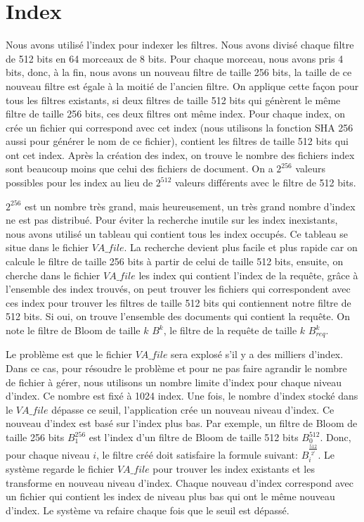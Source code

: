\section{Index}
	Nous avons utilisé l'index pour indexer les filtres. Nous avons divisé chaque filtre de 512 bits en 64 morceaux de 8 bits. Pour chaque morceau, nous avons pris 4 bits, donc, à la fin, nous avons un nouveau filtre de taille 256 bits, la taille de ce nouveau filtre est égale à la moitié de l'ancien filtre. On applique cette façon pour tous les filtres existants, si deux filtres de taille 512 bits qui génèrent le même filtre de taille 256 bits, ces deux filtres ont même index. Pour chaque index, on crée un fichier qui correspond avec cet index (\-nous utilisons la fonction SHA 256 aussi pour générer le nom de ce fichier), contient les filtres de taille 512 bits qui ont cet index. Après la création des index, on trouve le nombre des fichiers index sont beaucoup moins que celui des fichiers de document. On a $2^{256}$ valeurs possibles pour les index au lieu de $2^{512}$ valeurs différents avec le filtre de 512 bits.
	
	$2^{256}$ est un nombre très grand, mais heureusement, un très grand nombre d'index ne est pas distribué. Pour éviter la recherche inutile sur les index inexistants, nous avons utilisé un tableau qui contient tous les index occupés. Ce tableau se situe dans le fichier $VA\_file$. La recherche devient plus facile et plus rapide car on calcule le filtre de taille 256 bits à partir de celui de taille 512 bits, ensuite, on cherche dans le fichier $VA\_file$ les index qui contient l'index de la requête, grâce à l'ensemble des index trouvés, on peut trouver les fichiers qui correspondent avec ces index pour trouver les filtres de taille 512 bits qui contiennent notre filtre de 512 bits. Si oui, on trouve l'ensemble des documents qui contient la requête. On note le filtre de Bloom de taille $k$ $B^k$, le filtre de la requête de taille $k$ $B^{k}_{req}$.
	
	Le problème est que le fichier $VA\_file$ sera explosé s'il y a des milliers d'index. Dans ce cas, pour résoudre le problème et pour ne pas faire agrandir le nombre de fichier à gérer, nous utilisons un nombre limite d'index pour chaque niveau d'index. Ce nombre est fixé à 1024 index. Une fois, le nombre d'index stocké dans le $VA\_file$ dépasse ce seuil, l'application crée un nouveau niveau d'index. Ce nouveau d'index est basé sur l'index plus bas. Par exemple, un filtre de Bloom de taille 256 bits $B^{256}_1$ est l'index d'un filtre de Bloom de taille 512 bits $B^{512}_0$. Donc, pour chaque niveau $i$, le filtre créé doit satisfaire la formule suivant: $B^{\frac{512}{2^i}}_i$. Le système regarde le fichier $VA\_file$ pour trouver les index existants et les transforme en nouveau niveau d'index. Chaque nouveau d'index correspond avec un fichier qui contient les index de niveau plus bas qui ont le même nouveau d'index. Le système va refaire chaque fois que le seuil est dépassé.
	
